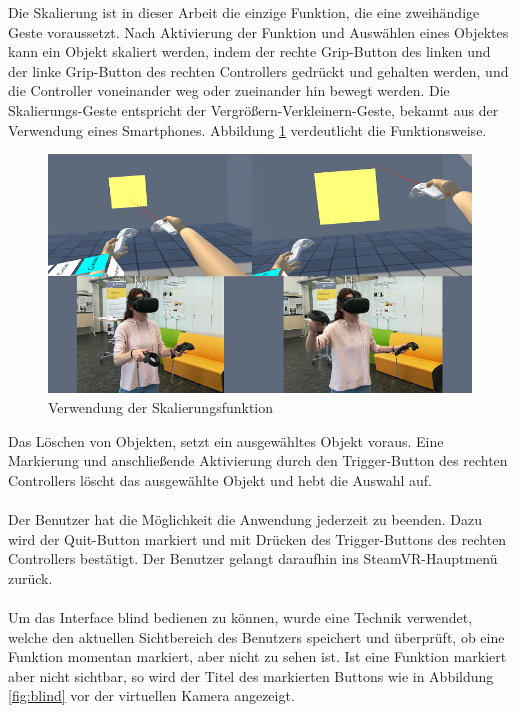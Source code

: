 \noindent Die Skalierung ist in dieser Arbeit die einzige Funktion, die eine zweihändige Geste voraussetzt. Nach Aktivierung der Funktion und Auswählen eines Objektes kann ein Objekt skaliert werden, indem der rechte Grip-Button des linken und der linke Grip-Button des rechten Controllers gedrückt und gehalten werden, und die Controller voneinander weg oder zueinander hin bewegt werden. Die Skalierungs-Geste entspricht der Vergrößern-Verkleinern-Geste, bekannt aus der Verwendung eines Smartphones. Abbildung \ref{fig:skalierung} verdeutlicht die Funktionsweise.

\begin{figure}[h]
\captionsetup{width=.7\linewidth}
\includegraphics[scale=0.6]{Bilder/Hauptteil/Bearbeitet/SkalierungMerge}
\centering
\caption{Verwendung der Skalierungsfunktion}
\label{fig:skalierung}
\end{figure}

\noindent Das Löschen von Objekten, setzt ein ausgewähltes Objekt voraus. Eine Markierung und anschließende Aktivierung durch den Trigger-Button des rechten Controllers löscht das ausgewählte Objekt und hebt die Auswahl auf.\\
\\
Der Benutzer hat die Möglichkeit die Anwendung jederzeit zu beenden. Dazu wird der Quit-Button markiert und mit Drücken des Trigger-Buttons des rechten Controllers bestätigt. Der Benutzer gelangt daraufhin ins SteamVR-Hauptmenü zurück.\\
\\
Um das Interface blind bedienen zu können, wurde eine Technik verwendet, welche den aktuellen Sichtbereich des Benutzers speichert und überprüft, ob eine Funktion momentan markiert, aber nicht zu sehen ist. Ist eine Funktion markiert aber nicht sichtbar, so wird der Titel des markierten Buttons wie in Abbildung \ref{fig:blind} vor der virtuellen Kamera angezeigt.


